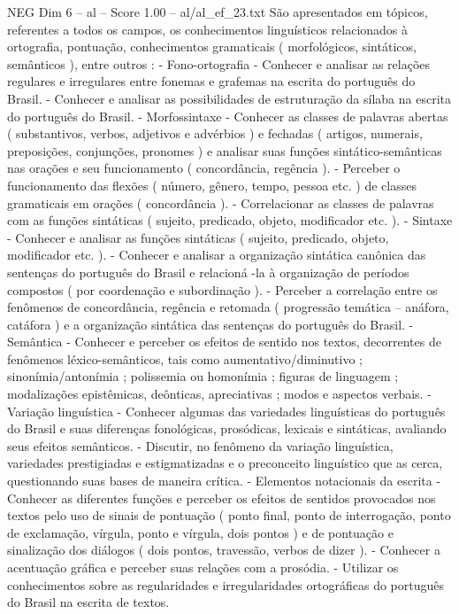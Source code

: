 \begin{textsample}{NEG Dim 6 – al – Score 1.00 – al/al\_ef\_23.txt}
São apresentados em tópicos, referentes a todos os campos, os conhecimentos linguísticos relacionados à ortografia, pontuação, conhecimentos gramaticais ( morfológicos, sintáticos, semânticos ), entre outros : - Fono-ortografia - Conhecer e analisar as relações regulares e irregulares entre fonemas e grafemas na escrita do português do Brasil. - Conhecer e analisar as possibilidades de estruturação da sílaba na escrita do português do Brasil. - Morfossintaxe - Conhecer as classes de palavras abertas ( substantivos, verbos, adjetivos e advérbios ) e fechadas ( artigos, numerais, preposições, conjunções, pronomes ) e analisar suas funções sintático-semânticas nas orações e seu funcionamento ( concordância, regência ). - Perceber o funcionamento das flexões ( número, gênero, tempo, pessoa etc. ) de classes gramaticais em orações ( concordância ). - Correlacionar as classes de palavras com as funções sintáticas ( sujeito, predicado, objeto, modificador etc. ). - Sintaxe - Conhecer e analisar as funções sintáticas ( sujeito, predicado, objeto, modificador etc. ). - Conhecer e analisar a organização sintática canônica das sentenças do português do Brasil e relacioná -la à organização de períodos compostos ( por coordenação e subordinação ). - Perceber a correlação entre os fenômenos de concordância, regência e retomada ( progressão temática – anáfora, catáfora ) e a organização sintática das sentenças do português do Brasil. - Semântica - Conhecer e perceber os efeitos de sentido nos textos, decorrentes de fenômenos léxico-semânticos, tais como aumentativo/diminutivo ; sinonímia/antonímia ; polissemia ou homonímia ; figuras de linguagem ; modalizações epistêmicas, deônticas, apreciativas ; modos e aspectos verbais. - Variação linguística - Conhecer algumas das variedades linguísticas do português do Brasil e suas diferenças fonológicas, prosódicas, lexicais e sintáticas, avaliando seus efeitos semânticos. - Discutir, no fenômeno da variação linguística, variedades prestigiadas e estigmatizadas e o preconceito linguístico que as cerca, questionando suas bases de maneira crítica. - Elementos notacionais da escrita - Conhecer as diferentes funções e perceber os efeitos de sentidos provocados nos textos pelo uso de sinais de pontuação ( ponto final, ponto de interrogação, ponto de exclamação, vírgula, ponto e vírgula, dois pontos ) e de pontuação e sinalização dos diálogos ( dois pontos, travessão, verbos de dizer ). - Conhecer a acentuação gráfica e perceber suas relações com a prosódia. - Utilizar os conhecimentos sobre as regularidades e irregularidades ortográficas do português do Brasil na escrita de textos.

\end{textsample}
